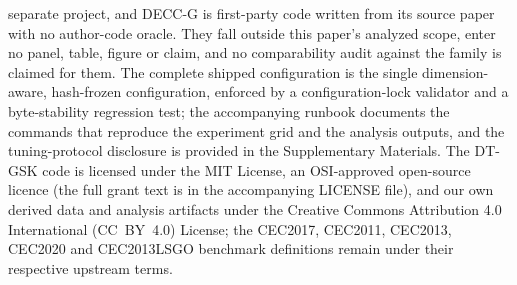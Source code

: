 \documentclass[algorithms,article,submit,moreauthors,pdftex]{Definitions/mdpi}
\newcommand{\dtgsk}{DT-GSK}
\begin{document}
separate project, and DECC-G is first-party code written from its source
paper with no author-code oracle. They fall outside this paper's
analyzed scope, enter no panel, table, figure or claim, and no
comparability audit against the family is claimed for
them. %
The complete shipped configuration is the single dimension-aware,
hash-frozen configuration, enforced by a configuration-lock validator
and a byte-stability regression test; the accompanying runbook
documents the commands that reproduce the
experiment grid and the analysis outputs, and the tuning-protocol
disclosure is provided in the Supplementary
Materials. The \dtgsk{} code is licensed under the MIT License, an
OSI-approved open-source licence (the full grant text is in the
accompanying LICENSE file), and our own derived data and
analysis artifacts under the Creative Commons Attribution 4.0 International
(CC~BY~4.0) License; the CEC2017, CEC2011, CEC2013, CEC2020 and
CEC2013LSGO benchmark definitions remain
under their respective upstream terms. %
\end{document}
